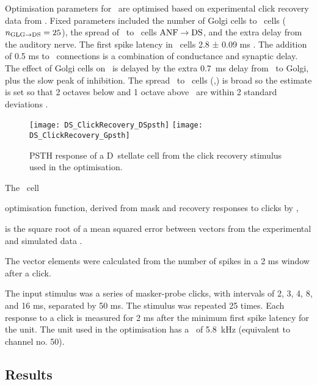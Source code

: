 % 


Optimisation parameters for \GLGDS~are optimised based on experimental click
recovery data from \citep{BackoffPalombiEtAl:1997}.  Fixed parameters included
the number of Golgi cells to \DS~cells ($\protect n_{\protect\textrm{{GLG}}\to\textrm{{DS}}} = 25$), the spread of \ANFs~to
\DS~cells $\protect\textrm{{ANF}}\to\textrm{{DS}}$, and the extra delay from the auditory nerve.  The first
spike latency in \DS~cells 2.8 ± 0.09 ms \citep{RhodeSmith:1986}. The addition of
0.5 ms to \ANFDS~connections is a combination of conductance and synaptic
delay. The effect of Golgi cells on \DS~is delayed by the extra 0.7~ms delay
from \ANF~to Golgi, plus the slow peak of \GABAa inhibition.  The spread \ANF~to
\DS~cells (\sANFDSh,\sANFDSl) is broad so the
estimate is set so that 2 octaves below and 1 octave above \CF~are within 2
standard deviations \citep{PaoliniClark:1999}.


 \begin{figure}[htb]
   \centering
\texttt{[image: DS\_ClickRecovery\_DSpsth]}%
\texttt{[image: DS\_ClickRecovery\_Gpsth]}%
   \caption{PSTH response of a D~stellate cell from the click recovery stimulus
   used in the optimisation.}\label{fig:ClickExamples}
 \end{figure}


The \DS~cell 

optimisation function, derived from mask and recovery responses to
clicks by \citet{BackoffPalombiEtAl:1997}, 


 is the square root of a mean squared error between vectors from the
experimental and simulated data . 

The vector elements were calculated from the
number of spikes in a 2 ms window after a click.  

The input stimulus was a series of masker-probe clicks, with intervals of 2, 3,
4, 8, and 16 ms, separated by 50 ms. The stimulus was repeated 25 times. Each
response to a click is measured for 2 ms after the minimum first spike latency
for the unit.  The unit used in the optimisation has a \CF~of 5.8~kHz
(equivalent to channel no. 50).


\subsection{Results}    \label{sec:DS:results}



